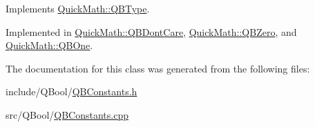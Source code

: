 Implements \hyperlink{classQuickMath_1_1QBType_a3fa2589c7d1fa4a52e79193bef845eeb}{Quick\+Math\+::\+Q\+B\+Type}.



Implemented in \hyperlink{classQuickMath_1_1QBDontCare_a40a7cfa35c7e91d392493277d3e5078e}{Quick\+Math\+::\+Q\+B\+Dont\+Care}, \hyperlink{classQuickMath_1_1QBZero_a1e7a0a5ca21ee665eccfc59ac7702403}{Quick\+Math\+::\+Q\+B\+Zero}, and \hyperlink{classQuickMath_1_1QBOne_a2cc8ebd48be0d6edbfe0356d54d14919}{Quick\+Math\+::\+Q\+B\+One}.



The documentation for this class was generated from the following files\+:\begin{DoxyCompactItemize}
\item 
include/\+Q\+Bool/\hyperlink{QBConstants_8h}{Q\+B\+Constants.\+h}\item 
src/\+Q\+Bool/\hyperlink{QBConstants_8cpp}{Q\+B\+Constants.\+cpp}\end{DoxyCompactItemize}
